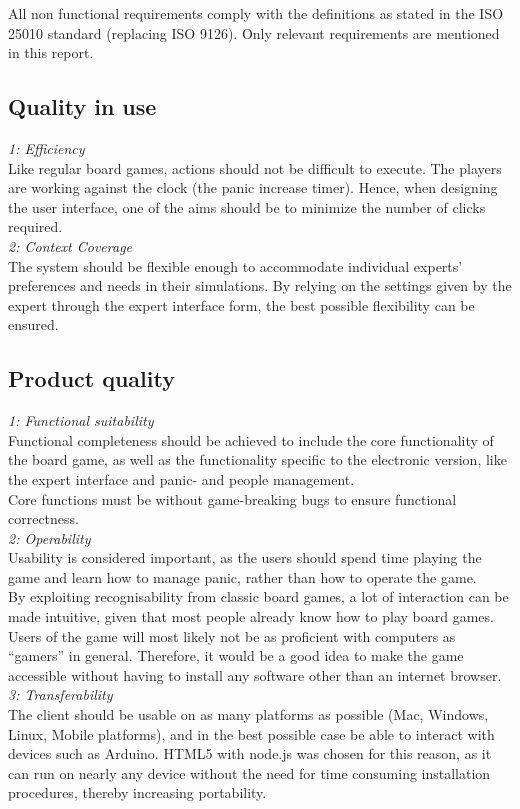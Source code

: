 All non functional requirements comply with the definitions as stated in the ISO 25010 standard (replacing ISO 9126). Only relevant requirements are mentioned in this report.

\subsection{Quality in use}

\emph{1: Efficiency}\\
Like regular board games, actions should not be difficult to execute. The players are working against the clock (the panic increase timer). Hence, when designing the user interface, one of the aims should be to minimize the number of clicks required.
\\\newline
\emph{2: Context Coverage}\\
The system should be flexible enough to accommodate individual experts’ preferences and needs in their simulations. By relying on the settings given by the expert through the expert interface form, the best possible flexibility can be ensured.

\subsection{Product quality}

\emph{1: Functional suitability}\\
Functional completeness should be achieved to include the core functionality 
of the board game, as well as the functionality specific to the electronic 
version, like the expert interface and panic- and people management. 
\\
Core functions must be without game-breaking bugs to ensure functional 
correctness.
\\\newline
\emph{2: Operability}\\
Usability is considered important, as the users should spend time playing the 
game and learn how to manage panic, rather than how to operate the game. 
\\
By exploiting recognisability from classic board games, a lot of interaction 
can be made intuitive, given that most people already know how to play board 
games. 
\\
Users of the game will most likely not be as proficient with computers as 
“gamers” in general. Therefore, it would be a good idea to make the game 
accessible without having to install any software other than an internet browser.
\\\newline
\emph{3: Transferability}\\
The client should be usable on as many platforms as possible (Mac, Windows, 
Linux, Mobile platforms), and in the best possible case be able to interact 
with devices such as Arduino. HTML5 with node.js was chosen for this reason, as 
it can run on nearly any device without the need for time consuming 
installation procedures, thereby increasing portability.


